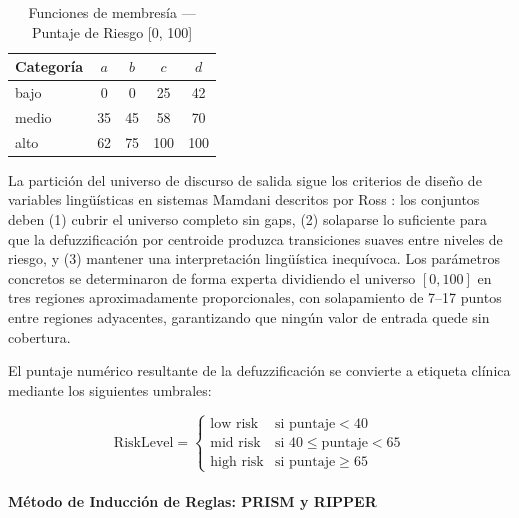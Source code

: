 \documentclass[11pt]{article}
\begin{document}
\begin{table}[H]
    \centering
    \caption{Funciones de membres\'ia --- Puntaje de Riesgo [0, 100]}
    \begin{tabular}{lcccc}
        \toprule
        \textbf{Categoría} & $a$ & $b$ & $c$ & $d$ \\
        \midrule
        bajo               & 0   & 0   & 25  & 42  \\
        medio              & 35  & 45  & 58  & 70  \\
        alto               & 62  & 75  & 100 & 100 \\
        \bottomrule
    \end{tabular}
    \par{}
\end{table}

La partici\'on del universo de discurso de salida sigue los criterios de dise\~no de variables ling\"u\'isticas en sistemas Mamdani descritos por Ross \cite{ross2010}: los conjuntos deben (1) cubrir el universo completo sin gaps, (2) solaparse lo suficiente para que la defuzzificaci\'on por centroide produzca transiciones suaves entre niveles de riesgo, y (3) mantener una interpretaci\'on ling\"u\'istica inequ\'ivoca. Los par\'ametros concretos se determinaron de forma experta dividiendo el universo $[0,100]$ en tres regiones aproximadamente proporcionales, con solapamiento de 7--17 puntos entre regiones adyacentes, garantizando que ning\'un valor de entrada quede sin cobertura.

El puntaje num\'erico resultante de la defuzzificaci\'on se convierte a etiqueta cl\'inica mediante los siguientes umbrales:

\begin{equation}
    \text{RiskLevel} =
    \begin{cases}
        \text{low risk}  & \text{si puntaje} < 40                 \\
        \text{mid risk}  & \text{si } 40 \leq \text{puntaje} < 65 \\
        \text{high risk} & \text{si puntaje} \geq 65
    \end{cases}
\end{equation}

\paragraph{M\'etodo de Inducci\'on de Reglas: PRISM y RIPPER}
\end{document}
